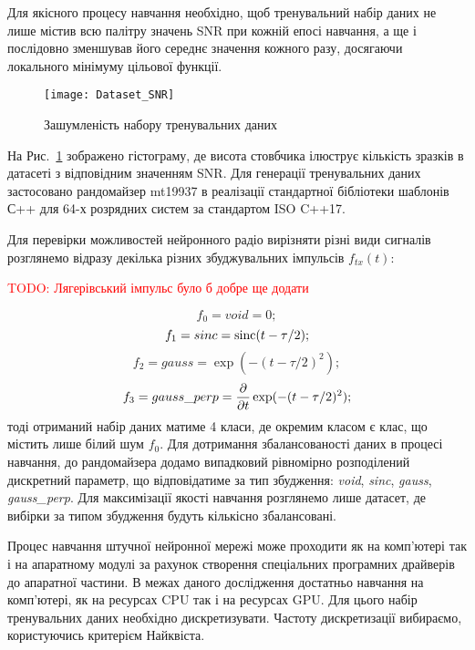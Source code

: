 Для якісного процесу навчання необхідно, щоб тренувальний набір даних не 
лише містив всю палітру значень SNR при кожній епосі навчання, а ще і 
послідовно зменшував його середнє значення кожного разу, досягаючи 
локального мінімуму цільової функції.

\begin{figure}[htbp] \begin{center}
\texttt{[image: Dataset\_SNR]}
\caption{Зашумленість набору тренувальних даних} \label{fig:SNR}
\end{center} \end{figure}

На Рис.~\ref{fig:SNR} зображено гістограму, де висота стовбчика ілюструє 
кількість зразків в датасеті з відповідним значенням SNR. Для генерації 
тренувальних даних застосовано рандомайзер mt19937 в реалізації стандартної
бібліотеки шаблонів С++ для 64-х розрядних систем за стандартом ISO C++17.

Для перевірки можливостей нейронного радіо вирізняти різні види сигналів 
розглянемо відразу декілька різних збуджувальних імпульсів $ f_{tx} (t) $:

\textcolor{red}{TODO: Лягерівський імпульс було б добре ще додати}

\begin{equation} \label{eq:type_void}
f_0 = void = 0;
\end{equation}
%
\begin{equation} \label{eq:type_sinc}
f_1 = sinc = \operatorname{sinc}(t-\tau/2);
\end{equation}
%
\begin{equation} \label{eq:type_gauss}
f_2 = gauss = \exp(- (t-\tau/2)^2 );
\end{equation}
%
\begin{equation} \label{eq:type_gauss_perp}
f_3 = gauss\_perp = \frac{\partial }{\partial t} \exp(- (t-\tau/2)^2 );
\end{equation}
%
тоді отриманий набір даних матиме 4 класи, де окремим класом є клас, що 
містить лише білий шум $ f_0 $. Для дотримання збалансованості даних в 
процесі навчання, до рандомайзера додамо випадковий рівномірно розподілений 
дискретний параметр, що відповідатиме за тип збудження: \textit{void}, 
\textit{sinc}, \textit{gauss}, \textit{gauss\_perp}. Для максимізації 
якості навчання розглянемо лише датасет, де вибірки за типом збудження 
будуть кількісно збалансовані. 

Процес навчання штучної нейронної мережі може проходити як на комп'ютері так 
і на апаратному модулі за рахунок створення спеціальних програмних драйверів
до апаратної частини. В межах даного дослідження достатньо навчання на 
комп'ютері, як на ресурсах CPU так і на ресурсах GPU. Для цього набір 
тренувальних даних необхідно дискретизувати. Частоту дискретизації 
вибираємо, користуючись критерієм Найквіста.

